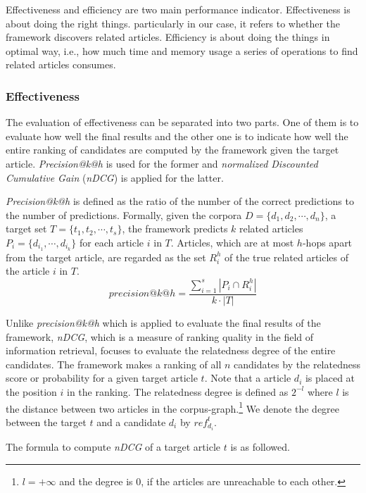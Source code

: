Effectiveness and efficiency are two main performance indicator. Effectiveness is about doing the right things. particularly in our case, it refers to whether the framework discovers related articles. Efficiency is about doing the things in optimal way, i.e., how much time and memory usage a series of operations to find related articles consumes. 

\subsubsection{Effectiveness}

The evaluation of effectiveness can be separated into two parts. One of them is to evaluate how well the final results and the other one is to indicate how well the entire ranking of candidates are computed by the framework given the target article. \textit{Precision@k@h} is used for the former and \textit{normalized Discounted Cumulative Gain} (\textit{nDCG}) is applied for the latter. 

\textit{Precision@k@h} is defined as the ratio of the number of the correct predictions to the number of predictions. Formally, given the corpora $D = \{d_1, d_2, \cdots, d_n\}$, a target set $T = \{t_1, t_2, \cdots, t_s\}$, the framework predicts $k$ related articles $P_i = \{d_{i_1}, \cdots, d_{i_k}\}$ for each article $i$ in $T$. Articles, which are at most $h$-hops apart from the target article, are regarded as the set $R_i^h$ of the true related articles of the article $i$ in $T$. 
\begin{equation}
    precision@k@h = \frac{\sum_{i=1}^s{|P_i \cap R_i^h|}}{k \cdot |T|}
\end{equation}

Unlike \textit{precision@k@h} which is applied to evaluate the final results of the framework, \textit{nDCG}, which is a measure of ranking quality in the field of information retrieval, focuses to evaluate the relatedness degree of the entire candidates. The framework makes a ranking of all $n$ candidates by the relatedness score or probability for a given target article $t$. Note that a article $d_i$ is placed at the position $i$ in the ranking. The relatedness degree is defined as $2^{-l}$ where $l$ is the distance between two articles in the corpus-graph.\footnote{$l=+\infty$ and the degree is $0$, if the articles are unreachable to each other.} We denote the degree between the target $t$ and a candidate $d_i$ by $ref_{d_i}^t$.

The formula to compute \textit{nDCG} of a target article $t$ is as followed. 

